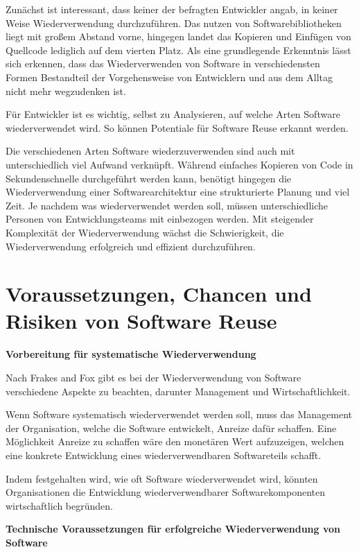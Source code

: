 \documentclass[utf8,biblatex]{lni}
\begin{document}
Zunächst ist interessant, dass keiner der befragten Entwickler angab, in keiner Weise Wiederverwendung durchzuführen. Das nutzen von Softwarebibliotheken liegt mit großem Abstand vorne, hingegen landet das Kopieren und Einfügen von Quellcode lediglich auf dem vierten Platz.
Als eine grundlegende Erkenntnis lässt sich erkennen, dass das Wiederverwenden von Software in verschiedensten Formen Bestandteil der Vorgehensweise von Entwicklern und aus dem Alltag nicht mehr wegzudenken ist.

Für Entwickler ist es wichtig, selbst zu Analysieren, auf welche Arten Software wiederverwendet wird. So können Potentiale für Software Reuse erkannt werden.  

Die verschiedenen Arten Software wiederzuverwenden sind auch mit unterschiedlich viel Aufwand verknüpft. Während einfaches Kopieren von Code in Sekundenschnelle durchgeführt werden kann, benötigt hingegen die Wiederverwendung einer Softwarearchitektur eine strukturierte Planung und viel Zeit. Je nachdem was wiederverwendet werden soll, müssen unterschiedliche Personen von Entwicklungsteams mit einbezogen werden. Mit steigender Komplexität der Wiederverwendung wächst die Schwierigkeit, die Wiederverwendung erfolgreich und effizient durchzuführen.



\section{Voraussetzungen, Chancen und Risiken von Software Reuse}



\textbf{Vorbereitung für systematische Wiederverwendung}


Nach Frakes and Fox \cite{WilliamB.FrakesandChristopherJ.Fox.1996} gibt es bei der Wiederverwendung von Software verschiedene Aspekte zu beachten, darunter Management und Wirtschaftlichkeit. 

Wenn Software systematisch wiederverwendet werden soll, muss das Management der Organisation, welche die Software entwickelt, Anreize dafür schaffen. Eine Möglichkeit Anreize zu schaffen wäre den monetären Wert aufzuzeigen, welchen eine konkrete Entwicklung eines wiederverwendbaren Softwareteils schafft. 

Indem festgehalten wird, wie oft Software wiederverwendet wird, könnten Organisationen die Entwicklung wiederverwendbarer Softwarekomponenten wirtschaftlich begründen. 


\textbf{Technische Voraussetzungen für erfolgreiche Wiederverwendung von Software}
\end{document}
